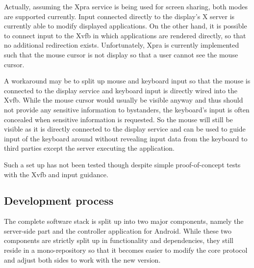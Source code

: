 Actually, assuming the Xpra service is being used for screen sharing, both modes are supported currently.
Input connected directly to the display's X server is currently able to modify displayed applications.
On the other hand, it is possible to connect input to the Xvfb in which applications are rendered directly, so that no additional redirection exists.
Unfortunately, Xpra is currently implemented such that the mouse cursor is not display so that a user cannot see the mouse cursor.

A workaround may be to split up mouse and keyboard input so that the mouse is connected to the display service and keyboard input is directly wired into the Xvfb.
While the mouse cursor would usually be visible anyway and thus should not provide any sensitive information to bystanders, the keyboard's input is often concealed when sensitive information is requested.
So the mouse will still be visible as it is directly connected to the display service and can be used to guide input of the keyboard around without revealing input data from the keyboard to third parties except the server executing the application.

Such a set up has not been tested though despite simple proof-of-concept tests with the Xvfb and input guidance.

\subsection{Development process}

The complete software stack is split up into two major components, namely the server-side part and the controller application for Android.
While these two components are strictly split up in functionality and dependencies, they still reside in a mono-repository so that it becomes easier to modify the core protocol and adjust both sides to work with the new version.

